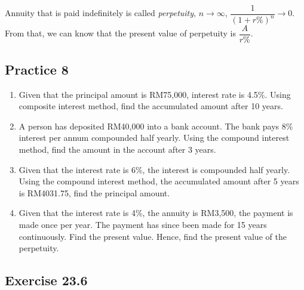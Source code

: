 \documentclass[12pt]{report}
\begin{document}
Annuity that is paid indefinitely is called \textit{perpetuity}, $n \to
    \infty$, $\dfrac{1}{(1+r\%)^n} \to 0$. From that, we can know that the present
value of perpetuity is $\dfrac{A}{r\%}$.

\subsection*{Practice 8}

\setlength{\columnseprule}{1pt}
\setlength{\columnsep}{24pt}
\begin{multicols}{2}
    \begin{enumerate}
        \item Given that the principal amount is RM75,000, interest rate is 4.5\%. Using
              composite interest method, find the accumulated amount after 10 years.
        \item A person has deposited RM40,000 into a bank account. The bank pays 8\% interest
              per annum compounded half yearly. Using the compound interest method, find the
              amount in the account after 3 years.
        \item Given that the interest rate is 6\%, the interest is compounded half yearly.
              Using the compound interest method, the accumulated amount after 5 years is
              RM4031.75, find the principal amount.
        \item Given that the interest rate is 4\%, the annuity is RM3,500, the payment is
              made once per year. The payment has since been made for 15 years continuously.
              Find the present value. Hence, find the present value of the perpetuity.
    \end{enumerate}
\end{multicols}

\subsection*{Exercise 23.6}
\end{document}
